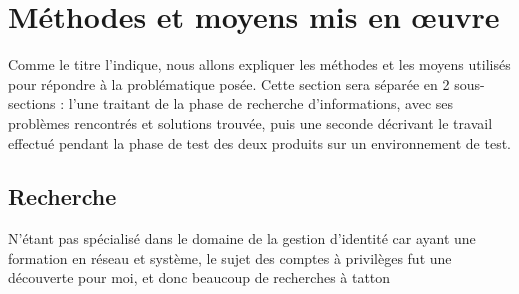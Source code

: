\section{Méthodes et moyens mis en œuvre}
\label{sec:meth_moy}

Comme le titre l'indique, nous allons expliquer les méthodes et les moyens utilisés pour répondre à la problématique posée. Cette section sera séparée en 2 sous-sections : l'une traitant de la phase de recherche d'informations, avec ses problèmes rencontrés et solutions trouvée, puis une seconde décrivant le travail effectué pendant la phase de test des deux produits sur un environnement de test.

\subsection{Recherche}
\label{subsec:recherche}

N'étant pas spécialisé dans le domaine de la gestion d'identité car ayant une formation en réseau et système, le sujet des comptes à privilèges fut une découverte pour moi, et donc beaucoup de recherches à tatton 